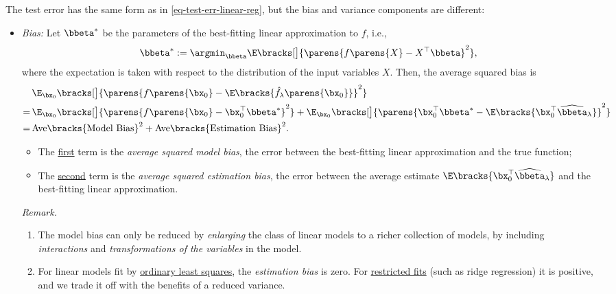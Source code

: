 \documentclass[12pt]{article}
\begin{document}
\begin{enumerate}[label=\textbf{\arabic*.}]
	The test error has the same form as in \eqref{eq-test-err-linear-reg}, but the bias and variance components are different: 
	\begin{itemize}
		\item \textit{Bias:} Let $\bbeta^*$ be the parameters of the best-fitting linear approximation to $f$, i.e., 
		\begin{align*}
			\bbeta^* := \argmin_{\bbeta} \E \bracks[\big]{ \parens{f \parens{X} - X^\top \bbeta}^2 }, 
		\end{align*}
		where the expectation is taken with respect to the distribution of the input variables $X$. Then, the average squared bias is 
		\begin{align*}
			& \, \E_{\bx_0} \bracks[\big]{ \parens{ f \parens{\bx_0} - \E \bracks{\hat{f}_{\lambda} \parens{\bx_0}}}^2 } \\ 
			= & \, \E_{\bx_0} \bracks[\big]{ \parens{ f \parens{\bx_0} - \bx_0^\top \bbeta^*}^2 } + \E_{\bx_0} \bracks[\big]{ \parens{\bx_0^\top \bbeta^* - \E \bracks{\bx_0^\top \widehat{\bbeta}_{\lambda}} }^2 } \\
			= & \, \mathrm{Ave} \bracks{ \text{Model Bias} }^2 + \mathrm{Ave}\bracks{ \text{Estimation Bias} }^2. 
		\end{align*}
		
		\begin{itemize}
			\item The \underline{first} term is the \textit{average squared model bias}, the error between the best-fitting linear approximation and the true function; 
			\item The \underline{second} term is the \textit{average squared estimation bias}, the error between the average estimate $ \E \bracks{\bx_0^\top \widehat{\bbeta}_{\lambda} } $ and the best-fitting linear approximation. 
		\end{itemize}

		\textit{Remark.} 
		\begin{enumerate}
			\item The model bias can only be reduced by \textit{enlarging} the class of linear models to a richer collection of models, by including \textit{interactions} and \textit{transformations of the variables} in the model. 
			\item For linear models fit by \underline{ordinary least squares}, the \textit{estimation bias} is zero. For \underline{restricted fits} (such as ridge regression) it is positive, and we trade it off with the benefits of a reduced variance. 
		\end{enumerate}
		

\end{itemize}
\end{enumerate}
\end{document}
